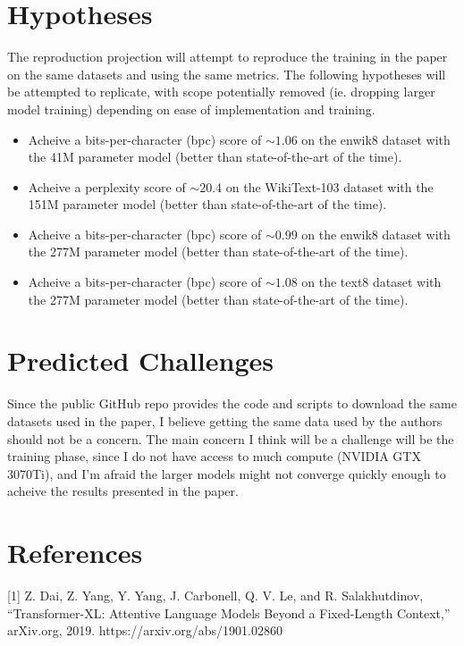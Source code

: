 \documentclass[11pt]{article}
\begin{document}
\section{Hypotheses}

The reproduction projection will attempt to reproduce the training in the paper on the same datasets and using the same metrics. The following hypotheses will be attempted to replicate, with scope potentially removed (ie. dropping larger model training) depending on ease of implementation and training.

\begin{itemize}
\item Acheive a bits-per-character (bpc) score of $\sim 1.06$ on the enwik8 dataset with the 41M parameter model (better than state-of-the-art of the time).
\item Acheive a perplexity score of $\sim 20.4$ on the WikiText-103 dataset with the 151M parameter model (better than state-of-the-art of the time).
\item Acheive a bits-per-character (bpc) score of $\sim 0.99$ on the enwik8 dataset with the 277M parameter model (better than state-of-the-art of the time).
\item Acheive a bits-per-character (bpc) score of $\sim 1.08$ on the text8 dataset with the 277M parameter model (better than state-of-the-art of the time).
\end{itemize}

\section{Predicted Challenges}

Since the public GitHub repo provides the code and scripts to download the same datasets used in the paper, I believe getting the same data used by the authors should not be a concern. The main concern I think will be a challenge will be the training phase, since I do not have access to much compute (NVIDIA GTX 3070Ti), and I'm afraid the larger models might not converge quickly enough to acheive the results presented in the paper.

\section{References}

[1] Z. Dai, Z. Yang, Y. Yang, J. Carbonell, Q. V. Le, and R. Salakhutdinov, “Transformer-XL: Attentive Language Models Beyond a Fixed-Length Context,” arXiv.org, 2019. https://arxiv.org/abs/1901.02860
\end{document}
